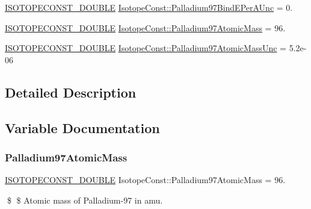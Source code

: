 \begin{DoxyCompactItemize}
\mbox{\hyperlink{group___isotope_const-_macros_ga8f45a7272ce02c0b4c65c44636ed719a}{I\+S\+O\+T\+O\+P\+E\+C\+O\+N\+S\+T\+\_\+\+D\+O\+U\+B\+LE}} \mbox{\hyperlink{group___isotope_const-_palladium-_pd97_ga65815b91d5e4e851b19fab61a548ca73}{Isotope\+Const\+::\+Palladium97\+Bind\+E\+Per\+A\+Unc}} = 0.
\item 
\mbox{\hyperlink{group___isotope_const-_macros_ga8f45a7272ce02c0b4c65c44636ed719a}{I\+S\+O\+T\+O\+P\+E\+C\+O\+N\+S\+T\+\_\+\+D\+O\+U\+B\+LE}} \mbox{\hyperlink{group___isotope_const-_palladium-_pd97_ga6ffa257b1b7c785be29c7d6fad9fa82b}{Isotope\+Const\+::\+Palladium97\+Atomic\+Mass}} = 96.
\item 
\mbox{\hyperlink{group___isotope_const-_macros_ga8f45a7272ce02c0b4c65c44636ed719a}{I\+S\+O\+T\+O\+P\+E\+C\+O\+N\+S\+T\+\_\+\+D\+O\+U\+B\+LE}} \mbox{\hyperlink{group___isotope_const-_palladium-_pd97_gab10839909354fd2457f401140b6a0512}{Isotope\+Const\+::\+Palladium97\+Atomic\+Mass\+Unc}} = 5.\+2e-\/06
\end{DoxyCompactItemize}


\subsection{Detailed Description}


\subsection{Variable Documentation}
\mbox{\label{group___isotope_const-_palladium-_pd97_ga6ffa257b1b7c785be29c7d6fad9fa82b}} 
\subsubsection{\texorpdfstring{Palladium97\+Atomic\+Mass}{Palladium97AtomicMass}}
{\footnotesize\ttfamily \mbox{\hyperlink{group___isotope_const-_macros_ga8f45a7272ce02c0b4c65c44636ed719a}{I\+S\+O\+T\+O\+P\+E\+C\+O\+N\+S\+T\+\_\+\+D\+O\+U\+B\+LE}} Isotope\+Const\+::\+Palladium97\+Atomic\+Mass = 96.}

\$ \$ Atomic mass of Palladium-\/97 in amu. \mbox{\label{group___isotope_const-_palladium-_pd97_gab10839909354fd2457f401140b6a0512}} 
